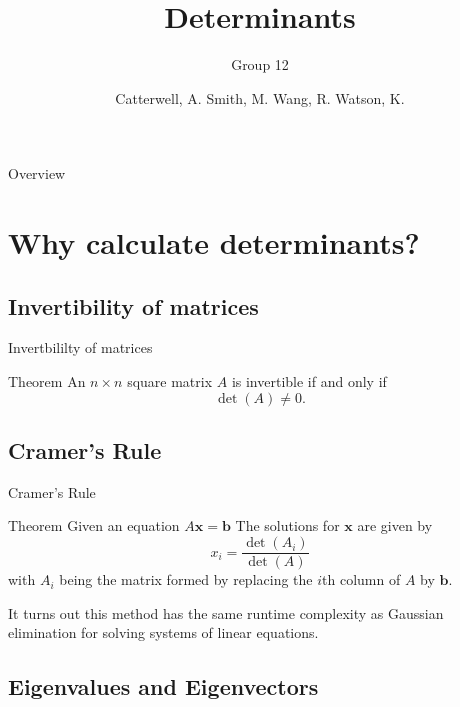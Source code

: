 \documentclass{beamer}
\title{Determinants}
\subtitle{Group 12}
\author{Catterwell, A. \quad Smith, M. \quad Wang, R. \quad Watson, K.}
\institute{University of Edinburgh}
\begin{document}
\begin{frame}
    \maketitle
\end{frame}

\begin{frame}[allowframebreaks]{Overview}
    \tableofcontents
\end{frame}

\section{Why calculate determinants?}

\subsection{Invertibility of matrices}
\begin{frame}{Invertbililty of matrices}

    \begin{block}{Theorem}
        An $n \times n$ square matrix $A$ is invertible if and only if
        \[
            \det(A) \neq 0.
        \]
    \end{block}

\end{frame}

\subsection{Cramer's Rule}

\begin{frame}{Cramer's Rule}

    \begin{block}{Theorem}
        Given an equation $A\mathbf{x} = \mathbf{b}$
        The solutions for $\mathbf{x}$ are given by
        \[
            x_i = \frac{\det(A_i)}{\det(A)}
        \]
        with $A_i$ being the matrix formed by replacing the $i$th column
        of $A$ by $\mathbf{b}$.
    \end{block}

    It turns out this method has the same runtime complexity as Gaussian elimination for solving
    systems of linear equations.

\end{frame}

\subsection{Eigenvalues and Eigenvectors}
\end{document}

